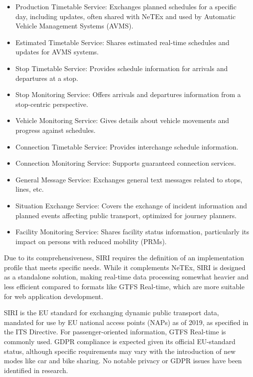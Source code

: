 \documentclass[12pt]{report}
\begin{document}
	\begin{itemize}[noitemsep]
		\item Production Timetable Service: Exchanges planned schedules for a specific day, including updates, often shared with NeTEx and used by Automatic Vehicle Management Systems (AVMS).
		\item Estimated Timetable Service: Shares estimated real-time schedules and updates for AVMS systems.
		\item Stop Timetable Service: Provides schedule information for arrivals and departures at a stop.
		\item Stop Monitoring Service: Offers arrivals and departures information from a stop-centric perspective.
		\item Vehicle Monitoring Service: Gives details about vehicle movements and progress against schedules.
		\item Connection Timetable Service: Provides interchange schedule information.
		\item Connection Monitoring Service: Supports guaranteed connection services.
		\item General Message Service: Exchanges general text messages related to stops, lines, etc.
		\item Situation Exchange Service: Covers the exchange of incident information and planned events affecting public transport, optimized for journey planners.
		\item Facility Monitoring Service: Shares facility status information, particularly its impact on persons with reduced mobility (PRMs).
	\end{itemize}
	
	Due to its comprehensiveness, SIRI requires the definition of an implementation profile that meets specific needs. While it complements NeTEx, SIRI is designed as a standalone solution, making real-time data processing somewhat heavier and less efficient compared to formats like GTFS Real-time, which are more suitable for web application development.
	
	SIRI is the EU standard for exchanging dynamic public transport data, mandated for use by EU national access points (NAPs) as of 2019, as specified in the ITS Directive. For passenger-oriented information, GTFS Real-time is commonly used. GDPR compliance is expected given its official EU-standard status, although specific requirements may vary with the introduction of new modes like car and bike sharing. No notable privacy or GDPR issues have been identified in research.
	
\end{document}
